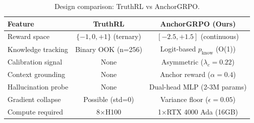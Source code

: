 \begin{table}[t]
\centering
\caption{Design comparison: TruthRL vs AnchorGRPO.}
\label{tab:design}
\begin{tabular}{lcc}
\toprule
\textbf{Feature} & \textbf{TruthRL} & \textbf{AnchorGRPO (Ours)} \\
\midrule
    Reward space & $\{-1, 0, +1\}$ (ternary) & $[-2.5, +1.5]$ (continuous) \\
    Knowledge tracking & Binary OOK (n=256) & Logit-based $p_{\text{know}}$ (O(1)) \\
    Calibration signal & None & Asymmetric ($\lambda_c = 0.22$) \\
    Context grounding & None & Anchor reward ($\alpha = 0.4$) \\
    Hallucination probe & None & Dual-head MLP (2-3M params) \\
    Gradient collapse & Possible (std=0) & Variance floor ($\epsilon = 0.05$) \\
    Compute required & 8$\times$H100 & 1$\times$RTX 4000 Ada (16GB) \\
\bottomrule
\end{tabular}
\end{table}
